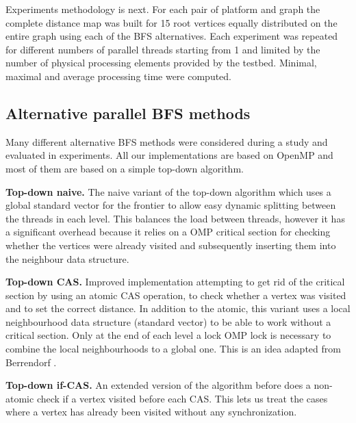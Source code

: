 \documentclass[letterpaper]{article}
\newcommand{\mypar}[1]{{\bf #1.}} %
\begin{document}
		Experiments methodology is next. 
		For each pair of platform and graph the complete distance map was built for 15 root vertices equally distributed on the entire graph using each of the BFS alternatives.
		Each experiment was repeated for different numbers of parallel threads starting from 1 and limited by the number of physical processing elements provided by the testbed.
		Minimal, maximal and average processing time were computed.
		
		\subsection{Alternative parallel BFS methods}\label{sec:approaches}
		Many different alternative BFS methods were considered during a study and evaluated in experiments.
		All our implementations are based on OpenMP and most of them are based on a simple top-down algorithm. 

		\mypar{Top-down naive}
		The naive variant of the top-down algorithm which uses a global standard vector for the frontier to allow easy dynamic splitting between the threads in each level. 
		This balances the load between threads, however it has a significant overhead because it relies on a OMP critical section for checking whether the vertices were already visited and subsequently inserting them into the neighbour data structure.

		\mypar{Top-down CAS}
		Improved implementation attempting to get rid of the critical section by using an atomic CAS operation, to check whether a vertex was visited and to set the correct distance. 
		In addition to the atomic, this variant uses a local neighbourhood data structure (standard vector) to be able to work without a critical section. 
		Only at the end of each level a lock OMP lock is necessary to combine the local neighbourhoods to a global one. 
		This is an idea adapted from Berrendorf \cite{Berrendorf:14}.
		
		\mypar{Top-down if-CAS}
		An extended version of the algorithm before does a non-atomic check if a vertex visited before each CAS. 
		This lets us treat the cases where a vertex has already been visited without any synchronization.
\end{document}
